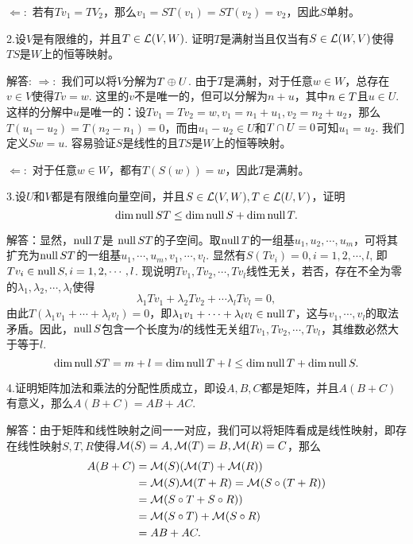 \documentclass[hyperref,]{ctexart}
\begin{document}
\(\Leftarrow:\)
若有\(Tv_1 = TV_2\)，那么\(v_1 = ST(v_1) = ST(v_2)=v_2\)，因此\(S\)单射。

\bigskip

\noindent{}2.设\(V\)是有限维的，并且\(T \in \mathcal{L}(V,W)\).
证明\(T\)是满射当且仅当有\(S\in\mathcal{L}(W,V)\)使得\(TS\)是\(W\)上的恒等映射。

\smallskip

\noindent{}解答: \(\Rightarrow:\)
我们可以将\(V\)分解为\(\null T \oplus U\).
由于\(T\)是满射，对于任意\(w\in W\)，总存在\(v\in V\)使得\(Tv=w\).
这里的\(v\)不是唯一的，但可以分解为\(n+u\)，其中\(n \in \null T\)且\(u \in U\).
这样的分解中\(u\)是唯一的：设\(Tv_1=Tv_2=w, v_1 = n_1+u_1, v_2=n_2+u_2\)，那么\(T(u_1-u_2)= T(n_2-n_1)=0\)，而由\(u_1-u_2\in U\)和\(\null T\cap U= {0}\)可知\(u_1=u_2\).
我们定义\(Sw = u\). 容易验证\(S\)是线性的且\(TS\)是\(W\)上的恒等映射。

\(\Leftarrow:\)
对于任意\(w\in W\)，都有\(T(S(w)) = w\)，因此\(T\)是满射。

\bigskip

\noindent{}3.设\(U\)和\(V\)都是有限维向量空间，并且\(S\in \mathcal{L}(V,W), T\in \mathcal{L}(U,V)\)，证明
\[\mathrm{dim}\, \mathrm{null}\, ST\le \mathrm{dim}\, \mathrm{null}\, S+\mathrm{dim}\,\mathrm{null}\, T.\]

\smallskip

\noindent{}解答：显然，\(\mathrm{null}\, T\)是
\(\mathrm{null}\, ST\)的子空间。取\(\mathrm{null}\, T\)的一组基\(u_1,u_2,\cdots,u_m\)，可将其扩充为\(\mathrm{null}\, ST\)的一组基\(u_1,\cdots,u_m,v_1,\cdots,v_l\).
显然有\(S(Tv_i)=0,i=1,2,\cdots,l\),
即\(Tv_i\in \mathrm{null}\, S, i=1,2,\cdots,l\).
现说明\(Tv_1,Tv_2,\cdots,Tv_l\)线性无关，若否，存在不全为零的\(\lambda_1,\lambda_2,\cdots,\lambda_l\)使得
\[\lambda_1 Tv_1+\lambda_2Tv_2+\cdots \lambda_lTv_l= 0,\]
由此\(T(\lambda_1 v_1+\cdots+\lambda_lv_l)=0\)，即\(\lambda_1 v_1+\cdots+\lambda_lv_l\in \mathrm{null}\, T\)，这与\(v_1,\cdots,v_l\)的取法矛盾。因此，\(\mathrm{null}\, S\)包含一个长度为\(l\)的线性无关组\(Tv_1,Tv_2,\cdots,Tv_l\)，其维数必然大于等于\(l\).
\[\mathrm{dim}\, \mathrm{null}\, ST=m+l =\mathrm{dim}\, \mathrm{null}\, T+l\le \mathrm{dim}\,\mathrm{null}\, T+\mathrm{dim}\, \mathrm{null}\, S.\]

\bigskip

\noindent{}4.证明矩阵加法和乘法的分配性质成立，即设\(A,B,C\)都是矩阵，并且\(A(B+C)\)有意义，那么\(A(B+C)=AB+AC\).

\smallskip

\noindent{}解答：由于矩阵和线性映射之间一一对应，我们可以将矩阵看成是线性映射，即存在线性映射\(S,T,R\)使得\(\mathcal{M}(S)=A,\mathcal{M}(T)=B,\mathcal{M}(R)=C\)，那么
\[
\begin{aligned}
A(B+C)&=\mathcal{M}(S) (\mathcal{M}(T)+\mathcal{M}(R))\\
&=\mathcal{M}(S) \mathcal{M}(T+R)=\mathcal{M}(S\circ(T+R)) \\
&= \mathcal{M}(S\circ T+S\circ R))\\
&= \mathcal{M}(S\circ T)+\mathcal{M}(S\circ R)\\
&= AB+AC. 
\end{aligned}\]
\end{document}
